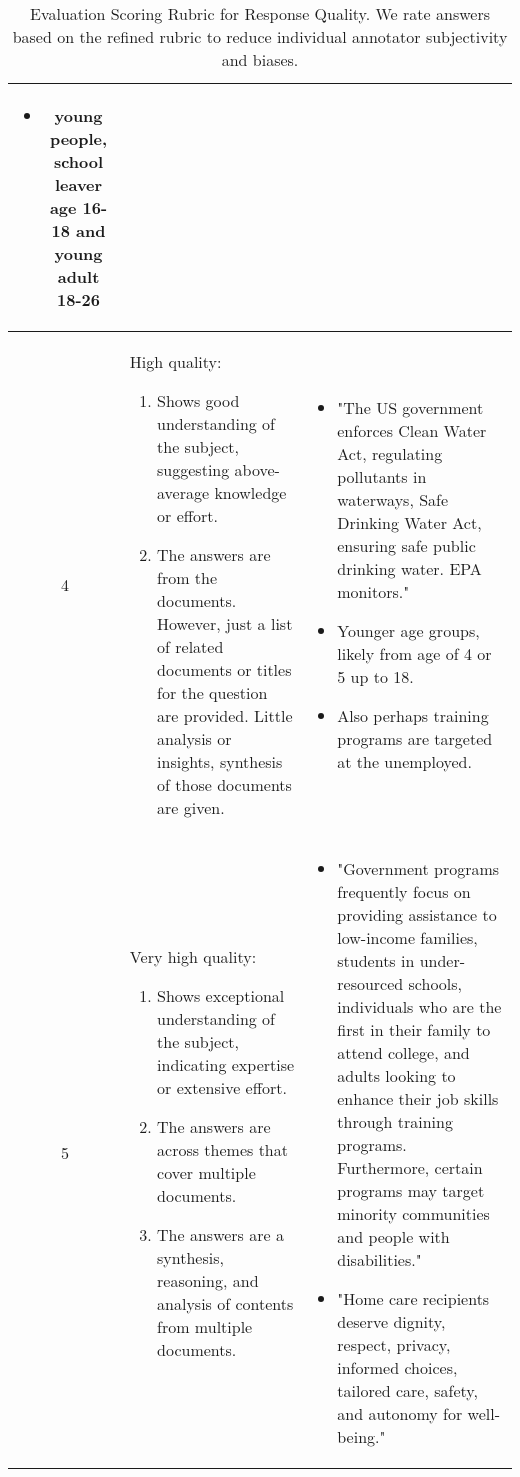 \begin{table*}[h]
\begin{tabular}{c|p{}|p{}}
\begin{itemize}[leftmargin=*]
        \item young people, school leaver age 16-18 and young adult 18-26
    \end{itemize} \\
    \midrule
    4 & High quality:
    \begin{enumerate}[leftmargin=*]
        \item Shows good understanding of the subject, suggesting above-average knowledge or effort.
        \item The answers are from the documents. However, just a list of related documents or titles for the question are provided. Little analysis or insights, synthesis of those documents are given.
    \end{enumerate} & 
    \begin{itemize}[leftmargin=*]
        \item "The US government enforces Clean Water Act, regulating pollutants in waterways, Safe Drinking Water Act, ensuring safe public drinking water. EPA monitors."
        \item Younger age groups, likely from age of 4 or 5 up to 18.
        \item Also perhaps training programs are targeted at the unemployed.
    \end{itemize} \\
    \midrule
    5 & Very high quality:
    \begin{enumerate}[leftmargin=*]
        \item Shows exceptional understanding of the subject, indicating expertise or extensive effort.
        \item The answers are across themes that cover multiple documents.
        \item The answers are a synthesis, reasoning, and analysis of contents from multiple documents.
    \end{enumerate} & 
    \begin{itemize}[leftmargin=*]
        \item "Government programs frequently focus on providing assistance to low-income families, students in under-resourced schools, individuals who are the first in their family to attend college, and adults looking to enhance their job skills through training programs. Furthermore, certain programs may target minority communities and people with disabilities."
        \item "Home care recipients deserve dignity, respect, privacy, informed choices, tailored care, safety, and autonomy for well-being."
    \end{itemize} \\
    \bottomrule
    \end{tabular}
    \caption{Evaluation Scoring Rubric for Response Quality. We rate answers based on the refined rubric to reduce individual annotator subjectivity and biases.}
    \label{tab:rubric}
\end{table*}

